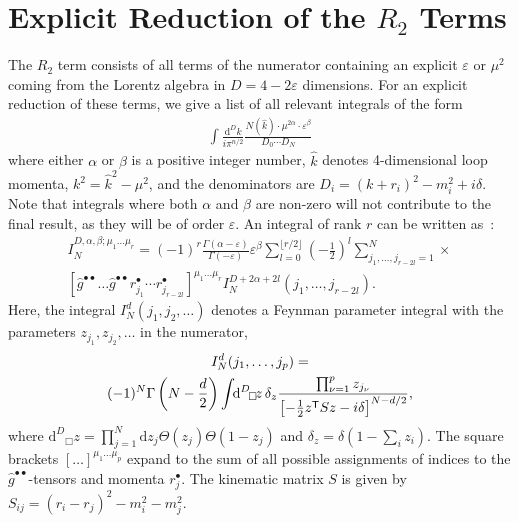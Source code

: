 \documentclass[11pt,a4paper]{refrep}
\newcommand{\diff}[1][{}]{{\mathrm{d}}^{#1}\!}
\begin{document}
\chapter{Explicit Reduction of the $R_2$ Terms}
The $R_2$ term \cite{Ossola:2008xq} consists of all terms of the numerator
containing an explicit $\varepsilon$ or $\mu^2$ coming from the Lorentz
algebra in $D=4-2\varepsilon$ dimensions. 
For an explicit reduction of these terms, we give a list of all relevant integrals of the form
\begin{align}
\int\frac{\diff[D] k}{i\pi^{n/2}}
\frac{N(\hat{k})\cdot\mu^{2\alpha}\cdot\varepsilon^\beta}{D_0\cdots D_N}
\end{align}
where either $\alpha$ or $\beta$ is a positive integer number, 
$\hat{k}$ denotes 4-dimensional loop momenta, $k^2=\hat{k}^2-\mu^2$, 
and the denominators are $D_i=(k+r_i)^2-m_i^2+i\delta$.
Note that integrals where both $\alpha$ and $\beta$ are
non-zero will not contribute to the final result, as they will be of order $\varepsilon$.
An integral of rank $r$ 
can be written as~\cite{Binoth:2005ff,Reiter:2009kb}:
\begin{multline}
I_N^{D,\alpha,\beta;\mu_1\ldots\mu_r}=
(-1)^{r}\frac{\Gamma(\alpha-\varepsilon)}{\Gamma(-\varepsilon)}
\varepsilon^\beta
\sum_{l=0}^{\lfloor r/2\rfloor}\left(-\frac12\right)^l
\sum_{j_1,\ldots,j_{r-2l}=1}^N
\times\\
\left[\hat{g}^{\bullet\bullet}\ldots
\hat{g}^{\bullet\bullet}r_{j_1}^\bullet
\cdots r_{j_{r-2l}}^\bullet\right]^{\mu_1\ldots\mu_r}
I_N^{D+2\alpha+2l}(j_1,\ldots,j_{r-2l}).
\end{multline}
Here, the integral $I_N^d(j_1,j_2,\ldots)$ denotes a Feynman parameter
integral with the parameters $z_{j_1}, z_{j_2}, \ldots$ in the numerator,
\begin{multline}
I_N^d(j_1,\ldots, j_p)=\\
(-1)^N\Gamma\left(N-\frac{d}2\right)%
\int\!\!\diff[D]_\Box\!z\,\delta_z
\frac{\prod_{\nu=1}^p z_{j_\nu}}{%
\left[-\frac12 z^{\mathsf{T}}Sz-i\delta\right]^{N-d/2}},
\end{multline}
where $\diff[D]_\Box\!z=
\prod_{j=1}^N\mathrm{d}z_j\Theta(z_j)\Theta(1-z_j)$
and $\delta_z=\delta(1-\sum_i z_i)$.
The square brackets $[\ldots]^{\mu_1\ldots\mu_p}$ expand to the sum of
all possible assignments of indices to the $\hat{g}^{\bullet\bullet}$-tensors
and momenta $r_j^\bullet$. 
The kinematic matrix $S$ is given by $S_{ij}=(r_i-r_j)^2-m_i^2-m_j^2$.
\end{document}

